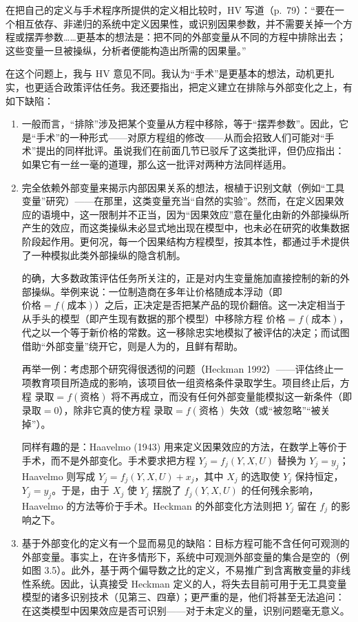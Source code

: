 在把自己的定义与手术程序所提供的定义相比较时，HV 写道（p.~79）：“要在一个相互依存、非递归的系统中定义因果性，或识别因果参数，并不需要关掉一个方程或摆弄参数……更基本的想法是：把不同的外部变量从不同的方程中排除出去；这些变量一旦被操纵，分析者便能构造出所需的因果量。”

在这个问题上，我与 HV 意见不同。我认为“手术”是更基本的想法，动机更扎实，也更适合政策评估任务。我还要指出，把定义建立在排除与外部变化之上，有如下缺陷：

\begin{enumerate}[label=\arabic*.,leftmargin=1.8em]
\item 一般而言，“排除”涉及把某个变量从方程中移除，等于“摆弄参数”。因此，它是“手术”的一种形式——对原方程组的修改——从而会招致人们可能对“手术”提出的同样批评。虽说我们在前面几节已驳斥了这类批评，但仍应指出：如果它有一丝一毫的道理，那么这一批评对两种方法同样适用。
\item 完全依赖外部变量来揭示内部因果关系的想法，根植于识别文献（例如“工具变量”研究）——在那里，这类变量充当“自然的实验”。然而，在定义因果效应的语境中，这一限制并不正当，因为“因果效应”意在量化由新的外部操纵所产生的效应，而这类操纵未必显式地出现在模型中，也未必在研究的收集数据阶段起作用。更何况，每一个因果结构方程模型，按其本性，都通过手术提供了一种模拟此类外部操纵的隐含机制。

的确，大多数政策评估任务所关注的，正是对内生变量施加直接控制的新的外部操纵。举例来说：一位制造商在多年让价格随成本浮动（即 $\text{价格}=f(\text{成本})$）之后，正决定是否把某产品的现价翻倍。这一决定相当于从手头的模型（即产生现有数据的那个模型）中移除方程 $\text{价格}=f(\text{成本})$，代之以一个等于新价格的常数。这一移除忠实地模拟了被评估的决定；而试图借助“外部变量”绕开它，则是人为的，且鲜有帮助。

再举一例：考虑那个研究得很透彻的问题（Heckman 1992）——评估终止一项教育项目所造成的影响，该项目依一组资格条件录取学生。项目终止后，方程 $\text{录取}=f(\text{资格})$ 将不再成立，而没有任何外部变量能模拟这一新条件（即 $\text{录取}=0$），除非它真的使方程 $\text{录取}=f(\text{资格})$ 失效（或“被忽略”“被关掉”）。

同样有趣的是：Haavelmo (1943) 用来定义因果效应的方法，在数学上等价于手术，而不是外部变化。手术要求把方程 $Y_j=f_j(Y,X,U)$ 替换为 $Y_j=y_j$；Haavelmo 则写成 $Y_j=f_j(Y,X,U)+x_j$，其中 $X_j$ 的选取使 $Y_j$ 保持恒定，$Y_j=y_j$。于是，由于 $X_j$ 使 $Y_j$ 摆脱了 $f_j(Y,X,U)$ 的任何残余影响，Haavelmo 的方法等价于手术。Heckman 的外部变化方法则把 $Y_j$ 留在 $f_j$ 的影响之下。
\item 基于外部变化的定义有一个显而易见的缺陷：目标方程可能不含任何可观测的外部变量。事实上，在许多情形下，系统中可观测外部变量的集合是空的（例如图 3.5）。此外，基于两个偏导数之比的定义，不易推广到含离散变量的非线性系统。因此，认真接受 Heckman 定义的人，将失去目前可用于无工具变量模型的诸多识别技术（见第三、四章）；更严重的是，他们将甚至无法追问：在这类模型中因果效应是否可识别——对于未定义的量，识别问题毫无意义。
\end{enumerate}

